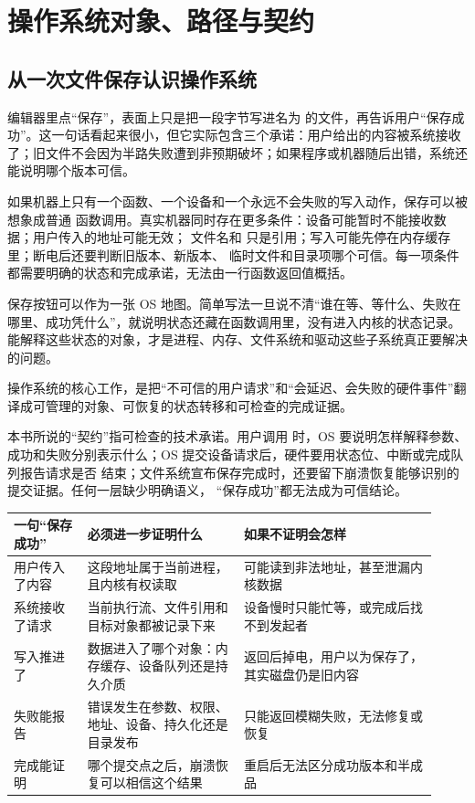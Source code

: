\chapter{操作系统对象、路径与契约}

\section{从一次文件保存认识操作系统}

编辑器里点“保存”，表面上只是把一段字节写进名为  的文件，再告诉用户“保存成功”。这一句话看起来很小，但它实际包含三个承诺：用户给出的内容被系统接收了；旧文件不会因为半路失败遭到非预期破坏；如果程序或机器随后出错，系统还能说明哪个版本可信。

如果机器上只有一个函数、一个设备和一个永远不会失败的写入动作，保存可以被想象成普通
函数调用。真实机器同时存在更多条件：设备可能暂时不能接收数据；用户传入的地址可能无效；
文件名和  只是引用；写入可能先停在内存缓存里；断电后还要判断旧版本、新版本、
临时文件和目录项哪个可信。每一项条件都需要明确的状态和完成承诺，无法由一行函数返回值概括。

保存按钮可以作为一张 OS 地图。简单写法一旦说不清“谁在等、等什么、失败在哪里、成功凭什么”，就说明状态还藏在函数调用里，没有进入内核的状态记录。能解释这些状态的对象，才是进程、内存、文件系统和驱动这些子系统真正要解决的问题。

\begin{keyidea}
操作系统的核心工作，是把“不可信的用户请求”和“会延迟、会失败的硬件事件”翻译成可管理的对象、可恢复的状态转移和可检查的完成证据。
\end{keyidea}

本书所说的“契约”指可检查的技术承诺。用户调用  时，OS 要说明怎样解释参数、
成功和失败分别表示什么；OS 提交设备请求后，硬件要用状态位、中断或完成队列报告请求是否
结束；文件系统宣布保存完成时，还要留下崩溃恢复能够识别的提交证据。任何一层缺少明确语义，
“保存成功”都无法成为可信结论。

\begin{longtable}{|L{0.16\linewidth}|L{0.34\linewidth}|L{0.42\linewidth}|}
\toprule
一句“保存成功” & 必须进一步证明什么 & 如果不证明会怎样 \\
\midrule
用户传入了内容 & 这段地址属于当前进程，且内核有权读取 & 可能读到非法地址，甚至泄漏内核数据 \\\tablerowrule
系统接收了请求 & 当前执行流、文件引用和目标对象都被记录下来 & 设备慢时只能忙等，或完成后找不到发起者 \\\tablerowrule
写入推进了 & 数据进入了哪个对象：内存缓存、设备队列还是持久介质 &  返回后掉电，用户以为保存了，其实磁盘仍是旧内容 \\\tablerowrule
失败能报告 & 错误发生在参数、权限、地址、设备、持久化还是目录发布 & 只能返回模糊失败，无法修复或恢复 \\\tablerowrule
完成能证明 & 哪个提交点之后，崩溃恢复可以相信这个结果 & 重启后无法区分成功版本和半成品 \\
\bottomrule
\end{longtable}

